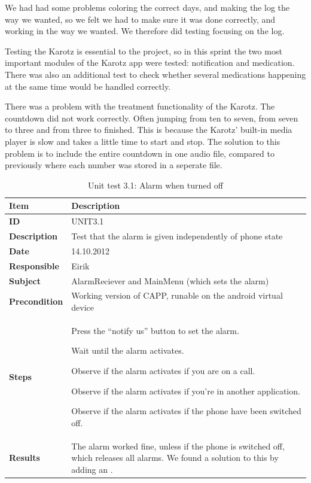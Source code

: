 We had had some problems coloring the correct days, and making the log the way we wanted, so we felt we had to make
sure it was done correctly, and working in the way we wanted. We therefore did testing focusing on the log.

Testing the Karotz is essential to the project, so in this sprint the two most important modules of the Karotz app
were tested: notification and medication. There was also an additional test to check whether several medications
happening at the same time would be handled correctly.

There was a problem with the treatment functionality of the Karotz. The countdown did not work correctly. Often jumping from ten to seven, from seven to three and from three to finished. This is because the Karotz' built-in media player is slow and takes a little
time to start and stop. The solution to this problem is to include the entire countdown in one audio file, compared to
previously where each number was stored in a seperate file.

\begin{table}
	\begin{center}
		\begin{tabular}{|p{3.0cm}|p{14.0cm}|}
			\hline
			\bf{Item} & \bf{Description}\\
			\hline
			\bf{ID} & UNIT3.1\\
			\bf{Description} & Test that the alarm is given independently of phone state\\
			\bf{Date} & 14.10.2012\\
			\bf{Responsible} & Eirik\\
			\bf{Subject} & AlarmReciever and MainMenu (which sets the alarm)\\
			\bf{Precondition} & Working version of CAPP, runable on the android virtual device\\
			\bf{Steps} &
			\begin{tabulenum}
				\item Press the ``notify us'' button to set the alarm.
				\item Wait until the alarm activates.
				\item Observe if the alarm activates if you are on a call.
				\item Observe if the alarm activates if you're in another application.
				\item Observe if the alarm activates if the phone have been switched off.
			\end{tabulenum}\\
			\hline
			\bf{Results} & The alarm worked fine, unless if the phone is switched off, which releases all alarms. We found a solution to this
			by adding an \code{onBootAction}.\\
			\hline
		\end{tabular}
	\end{center}
	\caption{Unit test 3.1: Alarm when turned off}
	\label{tab:unit3.1}
\end{table}

